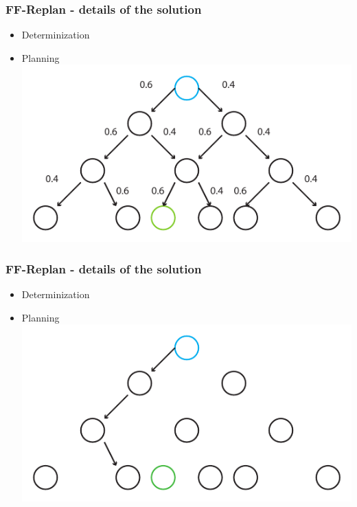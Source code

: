 \documentclass{beamer}
\let\origframetitle=\frametitle
\renewcommand\frametitle[1]{\origframetitle{\textbf{\large{\textrm{#1}}}}}
\begin{document}
\begin{frame}
  \frametitle{FF-Replan - details of the solution}

  \begin{itemize}
    \item Determinization
    \item Planning
 \includegraphics[width=\textwidth]{images/replan1.pdf}
   \end{itemize}
\end{frame}

\begin{frame}
  \frametitle{FF-Replan - details of the solution}

  \begin{itemize}
    \item Determinization
    \item Planning
 \includegraphics[width=\textwidth]{images/replan2.pdf}
   \end{itemize}
\end{frame}
\end{document}
